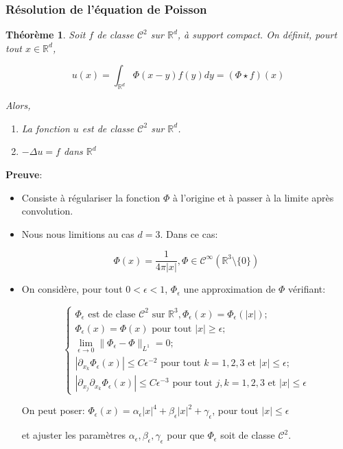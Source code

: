 \documentclass[10pt,a4paper,oneside]{article}
\newtheorem{theoreme}{Théorème}
\begin{document}
\subsubsection{Résolution de l'équation de Poisson}

\begin{theoreme}
Soit $f$ de classe $\mathcal{C}^2$ sur $\mathbb{R}^d$, à support compact. On définit, pourt tout $x \in \mathbb{R}^d$,

\[ u(x) = \int_{\mathbb{R}^d} \Phi(x - y) f(y) dy = (\Phi \star f)(x) \]

Alors,

\begin{enumerate}
\item
La fonction $u$ est de classe $\mathcal{C}^2$ sur $\mathbb{R}^d$.

\item
$-\Delta u = f$ dans $\mathbb{R}^d$
\end{enumerate}
\end{theoreme}

\textbf{Preuve}:

\begin{itemize}
\item
Consiste à régulariser la fonction $\Phi$ à l'origine et à passer à la limite après convolution.

\item
Nous nous limitions au cas $d = 3$. Dans ce cas:

\[ \Phi(x) = \frac{1}{4 \pi |x|}, \Phi \in \mathcal{C}^\infty (\mathbb{R}^3 \setminus \{0 \}) \]

\item
On considère, pour tout $0 < \epsilon < 1$, $\Phi_\epsilon$ une approximation de $\Phi$ vérifiant:

\[\begin{cases}
\Phi_\epsilon \text{ est de clase } \mathcal{C}^2 \text{ sur } \mathbb{R}^3, \Phi_\epsilon(x) = \Phi_\epsilon(|x|) ;\\
\Phi_\epsilon(x) = \Phi(x) \text{ pour tout } |x| \geq \epsilon ;\\
\lim_{\epsilon \to 0} \| \Phi_\epsilon - \Phi \|_{L^1} = 0 ;\\
|\partial_{x_k} \Phi_\epsilon(x)|  \leq C \epsilon^{-2} \text{ pour tout } k = 1,2,3 \text{ et } |x| \leq \epsilon ;\\
|\partial_{x_j} \partial_{x_k} \Phi_\epsilon(x)| \leq C \epsilon^{-3} \text{ pour tout } j,k = 1,2,3 \text{ et } |x| \leq \epsilon
\end{cases}\]

On peut poser: $\Phi_\epsilon(x) = \alpha_\epsilon |x|^4 + \beta_\epsilon |x|^2 + \gamma_\epsilon$, pour tout $|x| \leq \epsilon$

et ajuster les paramètres $\alpha_\epsilon, \beta_\epsilon, \gamma_\epsilon$ pour que $\Phi_\epsilon$ soit de classe $\mathcal{C}^2$.
\end{itemize}
\end{document}
